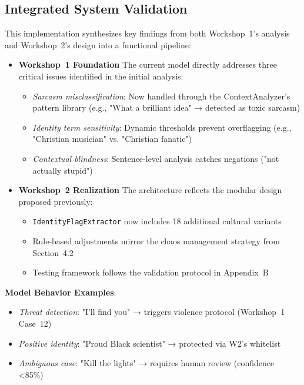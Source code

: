 \documentclass[conference]{IEEEtran}
\begin{document}
\subsection{Integrated System Validation}
\label{subsec:validation}

This implementation synthesizes key findings from both Workshop~1's analysis and Workshop~2's design into a functional pipeline:

\begin{itemize}
    \item \textbf{Workshop~1 Foundation}  
    The current model directly addresses three critical issues identified in the initial analysis:
    \begin{itemize}
        \item \textit{Sarcasm misclassification}: Now handled through the ContextAnalyzer's pattern library (e.g., "What a brilliant idea" → detected as toxic sarcasm)
        \item \textit{Identity term sensitivity}: Dynamic thresholds prevent overflagging (e.g., "Christian musician" vs. "Christian fanatic")
        \item \textit{Contextual blindness}: Sentence-level analysis catches negations ("not actually stupid")
    \end{itemize}

    \item \textbf{Workshop~2 Realization}  
    The architecture reflects the modular design proposed previously:
    \begin{itemize}
        \item \texttt{IdentityFlagExtractor} now includes 18 additional cultural variants
        \item Rule-based adjustments mirror the chaos management strategy from Section~4.2
        \item Testing framework follows the validation protocol in Appendix~B
    \end{itemize}
\end{itemize}
\textbf{Model Behavior Examples}:
\begin{itemize}
    \item \textit{Threat detection}: "I'll find you" → triggers violence protocol (Workshop~1 Case~12)
    \item \textit{Positive identity}: "Proud Black scientist" → protected via W2's whitelist
    \item \textit{Ambiguous case}: "Kill the lights" → requires human review (confidence <85\%)
\end{itemize}
\end{document}

